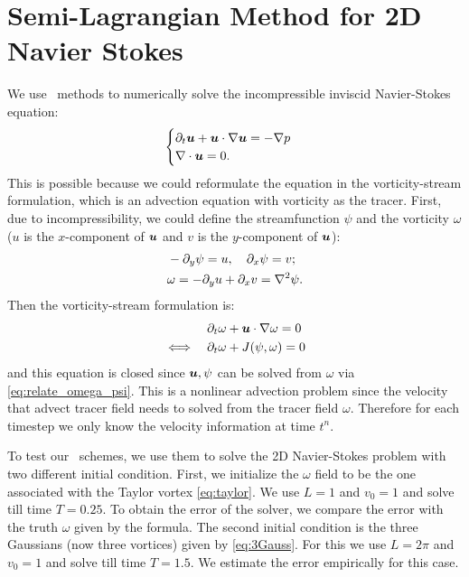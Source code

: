 \documentclass[11pt,letterpaper]{article}
\begin{document}
\begin{figure}[H]
    \caption{}\label{fig:conv_order_finu_}
\end{figure}

\section{Semi-Lagrangian Method for 2D Navier Stokes}\label{sec:nonli_adv}
We use \sml\ methods to numerically solve the incompressible inviscid Navier-Stokes equation:
\begin{align}
    \begin{cases}
    \partial_t\boldsymbol{u}+\boldsymbol{u}\cdot\nabla\boldsymbol{u}=-\nabla p\\
    \nabla\cdot\boldsymbol{u} = 0.
    \end{cases}\label{eq:2d_Nav}
\end{align}
This is possible because we could reformulate the equation in the vorticity-stream formulation, which is an advection equation with vorticity as the tracer. First, due to incompressibility, we could define the streamfunction $\psi$ and the vorticity $\omega$ ($u$ is the $x$-component of $\boldsymbol{u}$ and $v$ is the $y$-component of $\boldsymbol{u}$):
\begin{align}
    &-\partial_y \psi = u,\quad  \partial_x \psi = v;\nonumber\\
    &\omega = -\partial_y u+\partial_x v = \nabla^2 \psi.\label{eq:relate_omega_psi}
\end{align}
Then the vorticity-stream formulation is:
\begin{align}
    &\partial_t\omega+\boldsymbol{u}\cdot\nabla\omega = 0\label{eq:vort_stream}\\
    \iff\quad&\partial_t\omega+J(\psi,\omega) = 0\nonumber
\end{align}
and this equation is closed since $\boldsymbol{u},\psi$ can be solved from $\omega$ via \eqref{eq:relate_omega_psi}. This is a nonlinear advection problem since the velocity that advect tracer field needs to solved from the tracer field $\omega$. Therefore for each timestep we only know the velocity information at time $t^n$. 

To test our \sml\ schemes, we use them to solve the 2D Navier-Stokes problem with two different initial condition. First, we initialize the $\omega$ field to be the one associated with the Taylor vortex \eqref{eq:taylor}. We use $L = 1$ and $v_0 = 1$ and solve till time $T = 0.25$. To obtain the error of the solver, we compare the error with the truth $\omega$ given by the formula. The second initial condition is the three Gaussians (now three vortices) given by \eqref{eq:3Gauss}. For this we use $L = 2\pi$ and $v_0 = 1$ and solve till time $T = 1.5$. We estimate the error empirically for this case. 
\end{document}
